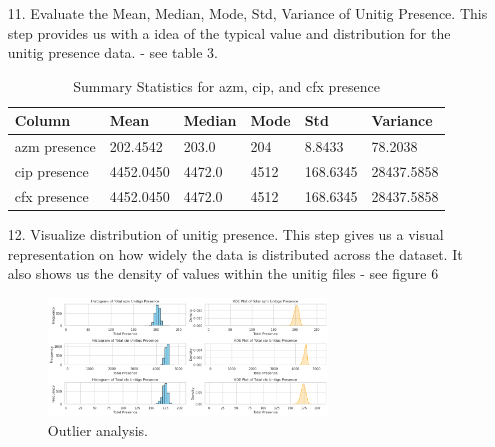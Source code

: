 \documentclass[manuscript,screen,review, nonacm]{acmart}
\begin{document}
\begin{itemize}
    \item[11.] Evaluate the Mean, Median, Mode, Std, Variance of Unitig Presence. This step provides us with a idea of the typical value and distribution for the unitig presence data. - see table 3.
        \begin{table}[H]
            \centering
            \begin{tabular}{|l|l|l|l|l|l|}
            \hline
            \textbf{Column}       & \textbf{Mean}    & \textbf{Median}  & \textbf{Mode}  & \textbf{Std}     & \textbf{Variance} \\ \hline
            azm presence          & 202.4542         & 203.0            & 204            & 8.8433           & 78.2038           \\ \hline
            cip presence          & 4452.0450        & 4472.0           & 4512           & 168.6345         & 28437.5858        \\ \hline
            cfx presence          & 4452.0450        & 4472.0           & 4512           & 168.6345         & 28437.5858        \\ \hline
            \end{tabular}
            \caption{Summary Statistics for azm, cip, and cfx presence}
        \end{table}

    \item[12.] Visualize distribution of unitig presence. This step gives us a visual representation on how widely the data is distributed across the dataset. It also shows us the density of values within the unitig files - see figure 6
        \begin{figure}[H]
            \centering
            \vspace{-10pt}
            \includegraphics[width=0.7\textwidth]{figures/unitighist.png}
            \caption{Outlier analysis.}
            \vspace{-10pt}
        \end{figure}


\end{itemize}
\end{document}
